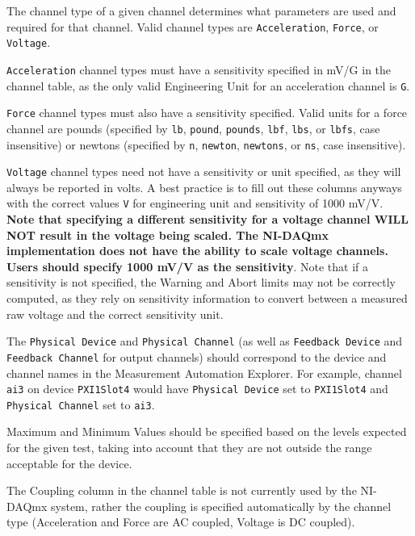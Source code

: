 \documentclass[pdf,12pt,report]{SANDreport}
\newcommand{\inlineCode}{\lstinline[basicstyle=\bfseries\ttfamily]}
\begin{document}
    The channel type of a given channel determines what parameters are used and required for that channel.  Valid channel types are \inlineCode{Acceleration}, \inlineCode{Force}, or \inlineCode{Voltage}.
    
    \inlineCode{Acceleration} channel types must have a sensitivity specified in mV/G in the channel table, as the only valid Engineering Unit for an acceleration channel is \inlineCode{G}.
    
    \inlineCode{Force} channel types must also have a sensitivity specified.  Valid units for a force channel are pounds (specified by \inlineCode{lb}, \inlineCode{pound}, \inlineCode{pounds}, \inlineCode{lbf}, \inlineCode{lbs}, or \inlineCode{lbfs}, case insensitive) or newtons (specified by \inlineCode{n}, \inlineCode{newton}, \inlineCode{newtons}, or \inlineCode{ns}, case insensitive).
    
    \inlineCode{Voltage} channel types need not have a sensitivity or unit specified, as they will always be reported in volts.  A best practice is to fill out these columns anyways with the correct values \inlineCode{V} for engineering unit and sensitivity of 1000 mV/V.  \textbf{Note that specifying a different sensitivity for a voltage channel WILL NOT result in the voltage being scaled.  The NI-DAQmx implementation does not have the ability to scale voltage channels.  Users should specify 1000 mV/V as the sensitivity}.  Note that if a sensitivity is not specified, the Warning and Abort limits may not be correctly computed, as they rely on sensitivity information to convert between a measured raw voltage and the correct sensitivity unit.
    
    The \inlineCode{Physical Device} and \inlineCode{Physical Channel} (as well as \inlineCode{Feedback Device} and \inlineCode{Feedback Channel} for output channels) should correspond to the device and channel names in the Measurement Automation Explorer.  For example, channel \inlineCode{ai3} on device \inlineCode{PXI1Slot4} would have \inlineCode{Physical Device} set to \inlineCode{PXI1Slot4} and \inlineCode{Physical Channel} set to \inlineCode{ai3}.
    
    Maximum and Minimum Values should be specified based on the levels expected for the given test, taking into account that they are not outside the range acceptable for the device.
    
    The Coupling column in the channel table is not currently used by the NI-DAQmx system, rather the coupling is specified automatically by the channel type (Acceleration and Force are AC coupled, Voltage is DC coupled).
    
\end{document}
